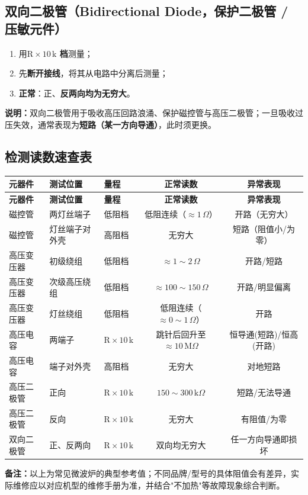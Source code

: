 \documentclass[12pt,a4paper]{ctexbook}
\begin{document}
\subsection{双向二极管（Bidirectional Diode，保护二极管 / 压敏元件）}
\begin{enumerate}
  \item 用\textbf{$\mathrm{R}\times10\,\mathrm{k}$ 档}测量；
  \item 先\textbf{断开接线}，将其从电路中分离后测量；
  \item \textbf{正常}：正、\textbf{反两向均为无穷大}。
\end{enumerate}
\textbf{说明：}双向二极管用于吸收高压回路浪涌、保护磁控管与高压二极管；一旦吸收过压失效，通常表现为\textbf{短路（某一方向导通）}，此时须更换。

\subsection*{检测读数速查表}
\begin{landscape}
\begin{center}
\small
\begin{tabularx}{\textheight}{|l|l|X|c|c|}
\hline
\textbf{元器件} & \textbf{测试位置} & \textbf{量程} & \textbf{正常读数} & \textbf{异常表现} \\ \hline
\endfirsthead
\hline
\textbf{元器件} & \textbf{测试位置} & \textbf{量程} & \textbf{正常读数} & \textbf{异常表现} \\ \hline
\endhead
\hline
\endlastfoot
磁控管 & 两灯丝端子 & 低阻档 & 低阻连续（$\approx 1\,\Omega$） & 开路（无穷大） \\ \hline
磁控管 & 灯丝端子对外壳 & 高阻档 & 无穷大 & 短路（阻值小/为零） \\ \hline
高压变压器 & 初级绕组 & 低阻档 & $\approx 1\sim2\,\Omega$ & 开路/短路 \\ \hline
高压变压器 & 次级高压绕组 & 低阻档 & $\approx 100\sim150\,\Omega$ & 开路/明显偏离 \\ \hline
高压变压器 & 灯丝绕组 & 低阻档 & 低阻连续（$\approx 0\sim1\,\Omega$） & 开路 \\ \hline
高压电容 & 两端子 & $\mathrm{R}\times10\,\mathrm{k}$ & 跳针后回升至 $\approx 10\,\mathrm{M}\Omega$ & 恒导通(短路)/恒高(开路) \\ \hline
高压电容 & 端子对外壳 & 高阻档 & 无穷大 & 对地短路 \\ \hline
高压二极管 & 正向 & $\mathrm{R}\times10\,\mathrm{k}$ & $150\sim300\,\mathrm{k}\Omega$ & 短路/无法导通 \\ \hline
高压二极管 & 反向 & $\mathrm{R}\times10\,\mathrm{k}$ & 无穷大 & 有阻值/为零 \\ \hline
双向二极管 & 正、反两向 & $\mathrm{R}\times10\,\mathrm{k}$ & 双向均无穷大 & 任一方向导通即损坏 \\ \hline
\end{tabularx}
\end{center}
\end{landscape}
\clearpage

\textbf{备注：}以上为常见微波炉的典型参考值；不同品牌/型号的具体阻值会有差异，实际维修应以对应机型的维修手册为准，并结合"不加热"等故障现象综合判断。
\end{document}

